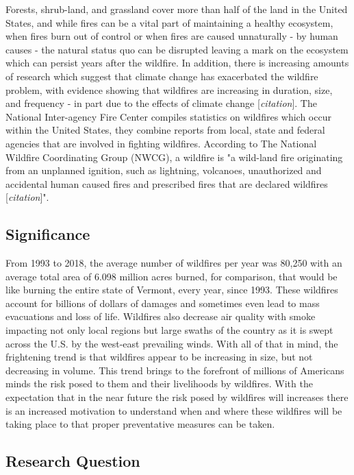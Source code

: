 \documentclass[12pt]{article}
\begin{document}
Forests, shrub-land, and grassland cover more than half of the land in the United States, and while fires can be a vital part of maintaining a healthy ecosystem, when fires burn out of control or when fires are caused unnaturally - by human causes -  the natural status quo can be disrupted leaving a mark on the ecosystem which can persist years after the wildfire. In addition, there is increasing amounts of research which suggest that climate change has exacerbated the wildfire problem, with evidence showing that wildfires are increasing in duration, size, and frequency - in part due to the effects of climate change [\textit{citation}]. The National Inter-agency Fire Center compiles statistics on wildfires which occur within the United States, they combine reports from local, state and federal agencies that are involved in fighting wildfires. According to The National Wildfire Coordinating Group (NWCG), a wildfire is "a wild-land fire originating from an unplanned ignition, such as lightning, volcanoes, unauthorized and accidental human caused fires and prescribed fires that are declared wildfires [\textit{citation}]". 

\subsection{\textrm{Significance}} 

From 1993 to 2018, the average number of wildfires per year was 80,250 with an average total area of 6.098 million acres burned, for comparison, that would be like burning the entire state of Vermont, every year, since 1993. These wildfires account for billions of dollars of damages and sometimes even lead to mass evacuations and loss of life. Wildfires also decrease air quality with smoke impacting not only local regions but large swaths of the country as it is swept across the U.S. by the west-east prevailing winds. With all of that in mind, the frightening trend is that wildfires appear to be increasing in size, but not decreasing in volume. This trend brings to the forefront of millions of Americans minds the risk posed to them and their livelihoods by wildfires. With the expectation that in the near future the risk posed by wildfires will increases there is an increased motivation to understand when and where these wildfires will be taking place to that proper preventative measures can be taken. \\

\subsection{\textrm{Research Question}}
\end{document}
